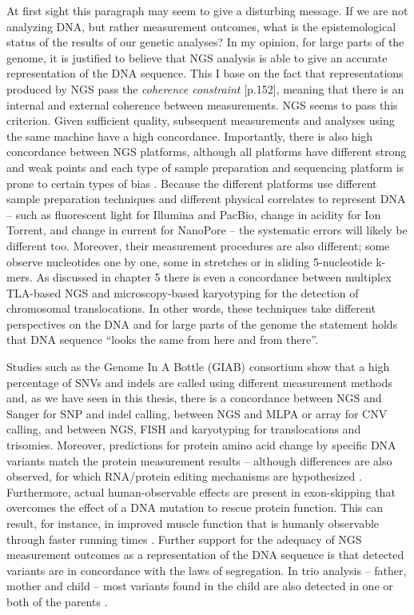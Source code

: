 At first sight this paragraph may seem to give a disturbing message. 
If we are not analyzing DNA, but rather measurement outcomes, what is the epistemological status of the results of our genetic analyses? 
In my opinion, for large parts of the genome, it is justified to believe that NGS analysis is able to give an accurate representation of the DNA sequence. 
This I base on the fact that representations produced by NGS pass the \textsl{coherence constraint} [p.152], meaning that there is an internal and external coherence between measurements. 
NGS seems to pass this criterion. 
Given sufficient quality, subsequent measurements and analyses using the same machine have a high concordance. 
Importantly, there is also high concordance between NGS platforms, although all platforms have different strong and weak points \cite{Rieber_2013} and each type of sample preparation and sequencing platform is prone to certain types of bias \cite{Aird_2011,Ross_2013}. 
Because the different platforms use different sample preparation techniques and different physical correlates to represent DNA – such as fluorescent light for Illumina and PacBio, change in acidity for Ion Torrent, and change in current for NanoPore – the systematic errors will likely be different too. 
Moreover, their measurement procedures are also different; some observe nucleotides one by one, some in stretches or in sliding 5-nucleotide k-mers. 
As discussed in chapter 5 there is even a concordance between multiplex TLA-based NGS and microscopy-based karyotyping for the detection of chromosomal translocations. 
In other words, these techniques take different perspectives on the DNA and for large parts of the genome the statement holds that DNA sequence “looks the same from here and from there”.

Studies such as the Genome In A Bottle (GIAB) consortium show that a high percentage of SNVs and indels are called using different measurement methods \cite{Zook_2018} and, as we have seen in this thesis, there is a concordance between NGS and Sanger for SNP and indel calling, between NGS and MLPA or array for CNV calling, and between NGS, FISH and karyotyping for translocations and trisomies. 
Moreover, predictions for protein amino acid change by specific DNA variants match the protein measurement results – although differences are also observed, for which RNA/protein editing mechanisms are hypothesized \cite{Wu_2012}. 
Furthermore, actual human-observable effects are present in exon-skipping that overcomes the effect of a DNA mutation to rescue protein function. 
This can result, for instance, in improved muscle function that is humanly observable through faster running times \cite{Miskew_Nichols_2016}. 
Further support for the adequacy of NGS measurement outcomes as a representation of the DNA sequence is that detected variants are in concordance with the laws of segregation. 
In trio analysis – father, mother and child – most variants found in the child are also detected in one or both of the parents \cite{Francioli_2014}. 

